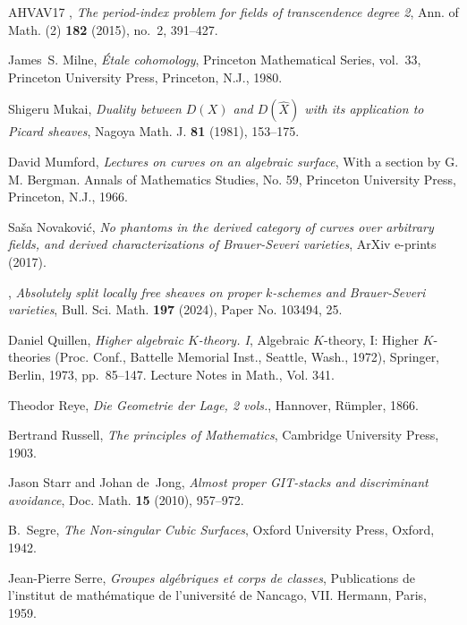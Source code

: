 \documentclass{amsart}
\theoremstyle{definition}
\theoremstyle{remark}
\begin{document}
\begin{thebibliography}{AHVAV17}
\bysame, \emph{The period-index problem for fields of transcendence degree 2},
  Ann. of Math. (2) \textbf{182} (2015), no.~2, 391--427. 

James~S. Milne, \emph{\'{E}tale cohomology}, Princeton Mathematical Series,
  vol.~33, Princeton University Press, Princeton, N.J., 1980. 

Shigeru Mukai, \emph{Duality between {$D(X)$} and {$D(\hat X)$} with its
  application to {P}icard sheaves}, Nagoya Math. J. \textbf{81} (1981),
  153--175. 

David Mumford, \emph{Lectures on curves on an algebraic surface}, With a
  section by G. M. Bergman. Annals of Mathematics Studies, No. 59, Princeton
  University Press, Princeton, N.J., 1966. 

Sa{\v s}a Novakovi\'c, \emph{{No phantoms in the derived category of curves
  over arbitrary fields, and derived characterizations of Brauer-Severi
  varieties}}, ArXiv e-prints (2017).

\bysame, \emph{Absolutely split locally free sheaves on proper {$k$}-schemes
  and {B}rauer-{S}everi varieties}, Bull. Sci. Math. \textbf{197} (2024), Paper
  No. 103494, 25. 

Daniel Quillen, \emph{Higher algebraic {$K$}-theory. {I}}, Algebraic
  {$K$}-theory, {I}: {H}igher {$K$}-theories ({P}roc. {C}onf., {B}attelle
  {M}emorial {I}nst., {S}eattle, {W}ash., 1972), Springer, Berlin, 1973,
  pp.~85--147. Lecture Notes in Math., Vol. 341. 

Theodor Reye, \emph{Die {G}eometrie der {L}age, 2 vols.}, Hannover,
  R{\"u}mpler, 1866.

Bertrand Russell, \emph{The principles of {M}athematics}, Cambridge University
  Press, 1903.

Jason Starr and Johan de~Jong, \emph{Almost proper {GIT}-stacks and
  discriminant avoidance}, Doc. Math. \textbf{15} (2010), 957--972.

B.~Segre, \emph{The {N}on-singular {C}ubic {S}urfaces}, Oxford University
  Press, Oxford, 1942. 

Jean-Pierre Serre, \emph{Groupes alg\'ebriques et corps de classes},
  Publications de l'institut de math\'ematique de l'universit\'e de Nancago,
  VII. Hermann, Paris, 1959. 


\end{thebibliography}
\end{document}
